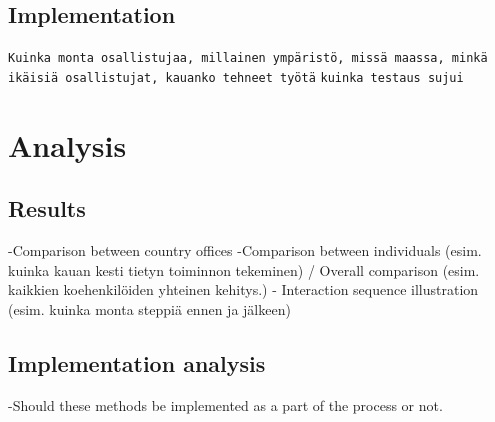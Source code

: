 \documentclass[12pt,a4paper,oneside,pdftex]{report}
\begin{document}
    \section{Implementation}
    \label{sec:implementation}
	\texttt{Kuinka monta osallistujaa, millainen ympäristö, missä maassa, minkä ikäisiä osallistujat, kauanko tehneet työtä}
    	\texttt{kuinka testaus sujui}
\chapter{Analysis}
\label{chapter:analysis}

    \section{Results}
    \label{sec:results}
    -Comparison between country offices
    -Comparison between individuals (esim. kuinka kauan kesti tietyn toiminnon tekeminen) / Overall comparison (esim. kaikkien koehenkilöiden yhteinen kehitys.)
- Interaction sequence illustration (esim. kuinka monta steppiä ennen ja jälkeen)

    \section{Implementation analysis}
    \label{sec:implementationanalysis}
    -Should these methods be implemented as a part of the process or not.






\end{document}
